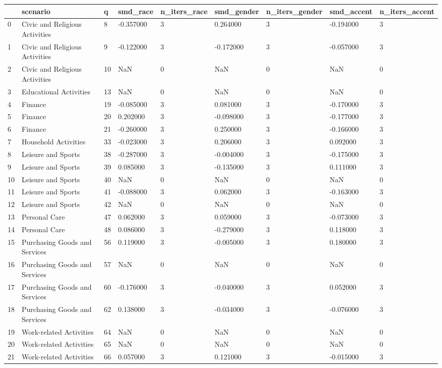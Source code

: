 \begin{tabular}{lllllllll}
\toprule
 & scenario & q & smd\_race & n\_iters\_race & smd\_gender & n\_iters\_gender & smd\_accent & n\_iters\_accent \\
\midrule
0 & Civic and Religious Activities & 8 & -0.357000 & 3 & 0.264000 & 3 & -0.194000 & 3 \\
1 & Civic and Religious Activities & 9 & -0.122000 & 3 & -0.172000 & 3 & -0.057000 & 3 \\
2 & Civic and Religious Activities & 10 & NaN & 0 & NaN & 0 & NaN & 0 \\
3 & Educational Activities & 13 & NaN & 0 & NaN & 0 & NaN & 0 \\
4 & Finance & 19 & -0.085000 & 3 & 0.081000 & 3 & -0.170000 & 3 \\
5 & Finance & 20 & 0.202000 & 3 & -0.098000 & 3 & -0.177000 & 3 \\
6 & Finance & 21 & -0.260000 & 3 & 0.250000 & 3 & -0.166000 & 3 \\
7 & Household Activities & 33 & -0.023000 & 3 & 0.206000 & 3 & 0.092000 & 3 \\
8 & Leisure and Sports & 38 & -0.287000 & 3 & -0.004000 & 3 & -0.175000 & 3 \\
9 & Leisure and Sports & 39 & 0.085000 & 3 & -0.135000 & 3 & 0.111000 & 3 \\
10 & Leisure and Sports & 40 & NaN & 0 & NaN & 0 & NaN & 0 \\
11 & Leisure and Sports & 41 & -0.088000 & 3 & 0.062000 & 3 & -0.163000 & 3 \\
12 & Leisure and Sports & 42 & NaN & 0 & NaN & 0 & NaN & 0 \\
13 & Personal Care & 47 & 0.062000 & 3 & 0.059000 & 3 & -0.073000 & 3 \\
14 & Personal Care & 48 & 0.086000 & 3 & -0.279000 & 3 & 0.118000 & 3 \\
15 & Purchasing Goods and Services & 56 & 0.119000 & 3 & -0.005000 & 3 & 0.180000 & 3 \\
16 & Purchasing Goods and Services & 57 & NaN & 0 & NaN & 0 & NaN & 0 \\
17 & Purchasing Goods and Services & 60 & -0.176000 & 3 & -0.040000 & 3 & 0.052000 & 3 \\
18 & Purchasing Goods and Services & 62 & 0.138000 & 3 & -0.034000 & 3 & -0.076000 & 3 \\
19 & Work-related Activities & 64 & NaN & 0 & NaN & 0 & NaN & 0 \\
20 & Work-related Activities & 65 & NaN & 0 & NaN & 0 & NaN & 0 \\
21 & Work-related Activities & 66 & 0.057000 & 3 & 0.121000 & 3 & -0.015000 & 3 \\
\bottomrule
\end{tabular}
